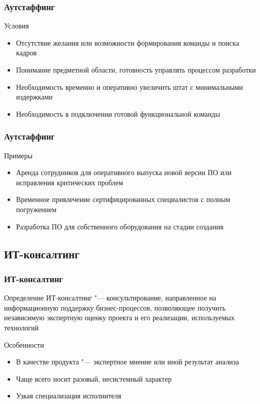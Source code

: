 \documentclass{../industrial-development}
\begin{document}
\begin{frame} \frametitle{Аутстаффинг}
	\begin{block}{Условия}
		\begin{itemize}
			\item Отсутствие желания или возможности формирования команды и поиска кадров
			\item Понимание предметной области, готовность управлять процессом разработки
			\item Необходимость временно и оперативно увеличить штат с минимальными издержками
			\item Необходимость в подключении готовой функциональной команды
		\end{itemize}
	\end{block}
\end{frame}
\lecturenotes


\begin{frame} \frametitle{Аутстаффинг}
	\begin{block}{Примеры}
		\begin{itemize}
			\item Аренда сотрудников для оперативного выпуска новой версии ПО или исправления критических проблем
			\item Временное привлечение сертифицированных специалистов с полным погружением
			\item Разработка ПО для собственного оборудования на стадии создания
		\end{itemize}
	\end{block}
\end{frame}
\lecturenotes


\subsection{ИТ-консалтинг}


\begin{frame} \frametitle{ИТ-консалтинг}
	\begin{block}{Определение}
		\alert{ИТ-консалтинг} "--- консультирование, направленное на  информационную поддержку бизнес-процессов, позволяющее получить независимую экспертную оценку проекта и его реализации, используемых технологий
	\end{block}
	\begin{block}{Особенности}
		\begin{itemize}
			\item В качестве продукта "--- экспертное мнение или иной результат анализа
			\item Чаще всего носит разовый, несистемный характер
			\item Узкая специализация исполнителя
		\end{itemize}
	\end{block}
\end{frame}
\lecturenotes
\end{document}
